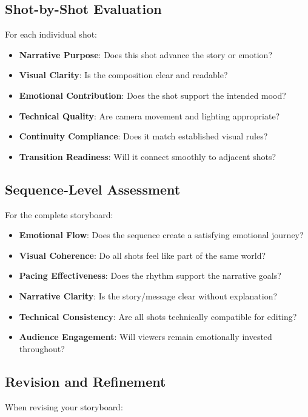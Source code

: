 \subsection*{Shot-by-Shot Evaluation}
For each individual shot:

\begin{itemize}
\item[$\square$] \textbf{Narrative Purpose}: Does this shot advance the story or emotion?
\item[$\square$] \textbf{Visual Clarity}: Is the composition clear and readable?
\item[$\square$] \textbf{Emotional Contribution}: Does the shot support the intended mood?
\item[$\square$] \textbf{Technical Quality}: Are camera movement and lighting appropriate?
\item[$\square$] \textbf{Continuity Compliance}: Does it match established visual rules?
\item[$\square$] \textbf{Transition Readiness}: Will it connect smoothly to adjacent shots?
\end{itemize}

\subsection*{Sequence-Level Assessment}
For the complete storyboard:

\begin{itemize}
\item[$\square$] \textbf{Emotional Flow}: Does the sequence create a satisfying emotional journey?
\item[$\square$] \textbf{Visual Coherence}: Do all shots feel like part of the same world?
\item[$\square$] \textbf{Pacing Effectiveness}: Does the rhythm support the narrative goals?
\item[$\square$] \textbf{Narrative Clarity}: Is the story/message clear without explanation?
\item[$\square$] \textbf{Technical Consistency}: Are all shots technically compatible for editing?
\item[$\square$] \textbf{Audience Engagement}: Will viewers remain emotionally invested throughout?
\end{itemize}

\subsection*{Revision and Refinement}
When revising your storyboard:

